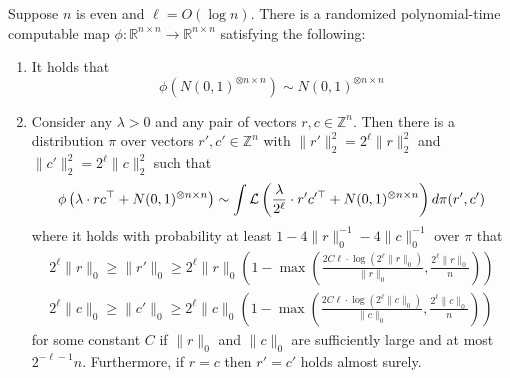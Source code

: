 \documentclass[11pt]{article}
\begin{document}
\begin{lemma}
Suppose $n$ is even and $\ell = O(\log n)$. There is a randomized polynomial-time computable map $\phi : \mathbb{R}^{n \times n} \to \mathbb{R}^{n \times n}$ satisfying the following:
\begin{enumerate}
\item It holds that
$$\phi\left(N(0, 1)^{\otimes n \times n}\right) \sim N(0, 1)^{\otimes n \times n}$$
\item Consider any $\lambda > 0$ and any pair of vectors $r, c \in \mathbb{Z}^n$. Then there is a distribution $\pi$ over vectors $r', c' \in \mathbb{Z}^n$ with $\| r' \|_2^2 = 2^\ell \| r \|_2^2$ and $\| c' \|_2^2 = 2^\ell \| c \|_2^2$ such that
$$\phi\left(\lambda \cdot r c^\top + N(0, 1)^{\otimes n \times n}\right) \sim \int \mathcal{L}\left( \frac{\lambda}{2^\ell} \cdot r' c'^\top + N(0, 1)^{\otimes n \times n} \right) d\pi(r', c')$$
where it holds with probability at least $1 - 4\| r \|_0^{-1} - 4\| c \|_0^{-1}$ over $\pi$ that
\begin{align*}
2^\ell \| r \|_0 \ge \| r' \|_0 \ge 2^\ell \| r \|_0 \left( 1 - \max\left(\frac{2C\ell \cdot \log (2^\ell \| r \|_0)}{\| r \|_0}, \frac{2^\ell \| r \|_0}{n}\right) \right) \\ 
2^\ell \| c \|_0 \ge \| c' \|_0 \ge 2^\ell \| c \|_0 \left( 1 - \max\left(\frac{2C\ell \cdot \log (2^\ell \| c \|_0)}{\| c \|_0}, \frac{2^\ell \| c \|_0}{n}\right) \right)
\end{align*}
for some constant $C$ if $\| r \|_0$ and $\| c \|_0$ are sufficiently large and at most $2^{-\ell-1} n$. Furthermore, if $r = c$ then $r' = c'$ holds almost surely.
\end{enumerate}
\end{lemma}
\end{document}
